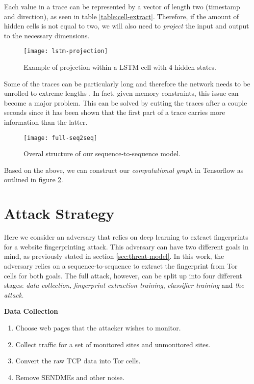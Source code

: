 Each value in a trace can be represented by a vector of length two (timestamp and direction), as seen in table \ref{table:cell-extract}.
Therefore, if the amount of hidden cells is not equal to two, we will also need to \textit{project} the input and output to the necessary dimensions.

\begin{figure}[ht]
  \centering
  \texttt{[image: lstm-projection]}
  \caption{Example of projection within a LSTM cell with 4 hidden states.}
  \label{fig:lstm-projection}
\end{figure}

\newpage

Some of the traces can be particularly long and therefore the network needs to be unrolled to extreme lengths \cite{greschbach2016effect}.
In fact, given memory constraints, this issue can become a major problem.
This can be solved by cutting the traces after a couple seconds since it has been shown that the first part of a trace carries more information than the latter.

\begin{figure}[ht]
  \centering
  \texttt{[image: full-seq2seq]}
  \caption{Overal structure of our sequence-to-sequence model.}
  \label{fig:full-seq2seq}
\end{figure}

Based on the above, we can construct our \textit{computational graph} in Tensorflow as outlined in figure \ref{fig:full-seq2seq}.

\section{Attack Strategy}

Here we consider an adversary that relies on deep learning to extract fingerprints for a website fingerprinting attack.
This adversary can have two different goals in mind, as previously stated in section \ref{sec:threat-model}.
In this work, the adversary relies on a sequence-to-sequence to extract the fingerprint from Tor cells for both goals.
The full attack, however, can be split up into four different stages: \textit{data collection}, \textit{fingerprint extraction training}, \textit{classifier training} and \textit{the attack}.

\noindent
\textbf{Data Collection}
\begin{enumerate}
  \item Choose web pages that the attacker wishes to monitor.
  \item Collect traffic for a set of monitored sites and unmonitored sites.
  \item Convert the raw TCP data into Tor cells.
  \item Remove SENDMEs and other noise.
\end{enumerate}

